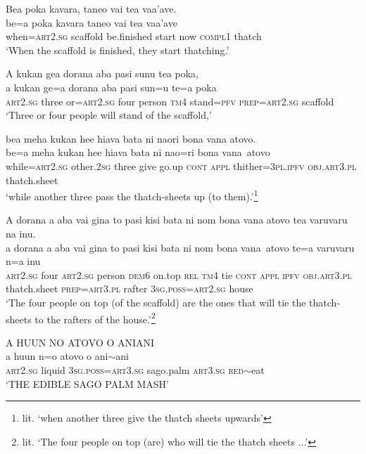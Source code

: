 \ea\label{ex:text2-38}
Bea poka kavara, taneo vai tea vaa'ave.\\
\gll be=a	poka	kavara	taneo	vai	tea	vaa'ave\\
     when=\textsc{art}2.\textsc{sg}	scaffold	be.finished	start	now	\textsc{compl}1	thatch\\
\glt `When the scaffold is finished, they start thatching.'
\z

\ea\label{ex:text2-39}
A kukan gea dorana aba pasi sunu tea poka,\\
\gll a	kukan	ge=a	dorana	aba	pasi	sun=u	te=a	poka\\
     \textsc{art}2.\textsc{sg}	three	or=\textsc{art}2.\textsc{sg}	four	person	\textsc{tm}4	stand=\textsc{pfv}	\textsc{prep}=\textsc{art}2.\textsc{sg}	scaffold\\
\glt `Three or four people will stand of the scaffold,'
\z

\ea\label{ex:text2-40}
bea meha kukan hee hiava bata ni naori bona vana atovo.\\
\gll be=a	meha	kukan	hee	hiava	bata	ni	nao=ri	bona	vana~atovo\\
     while=\textsc{art}2.\textsc{sg}	other.2\textsc{sg}	three	give	go.up	\textsc{cont}	\textsc{appl}	thither=3\textsc{pl}.\textsc{ipfv}	\textsc{obj}.\textsc{art}3.\textsc{pl}	thatch.sheet\\
\glt `while another three pass the thatch-sheets up (to them).'\footnote{lit. `when another three give the thatch sheets upwards'}
\z

\ea\label{ex:text2-41}
A dorana a aba vai gina to pasi kisi bata ni nom bona vana atovo tea varuvaru na inu.\\
\gll a	dorana	a	aba	vai	gina	to	pasi	kisi	bata	ni	nom	bona	vana~atovo	te=a	varuvaru	n=a	inu\\
     \textsc{art}2.\textsc{sg}	four	\textsc{art}2.\textsc{sg}	person	\textsc{dem}6	on.top	\textsc{rel}	\textsc{tm}4	tie	\textsc{cont}	\textsc{appl}	\textsc{ipfv}	\textsc{obj}.\textsc{art}3.\textsc{pl}	thatch.sheet	\textsc{prep}=\textsc{art}3.\textsc{pl}	rafter	3\textsc{sg}.\textsc{poss}=\textsc{art}2.\textsc{sg}	house\\
\glt `The four people on top (of the scaffold) are the ones that will tie the thatch-sheets to the rafters of the house.'\footnote{lit. `The four people on top (are) who will tie the thatch sheets ...'}
\z

\ea\label{ex:text2-42}
A HUUN NO ATOVO O ANIANI\\
\gll a	huun	n=o	atovo	o	ani{$\sim$}ani\\
     \textsc{art}2.\textsc{sg}	liquid	3\textsc{sg}.\textsc{poss}=\textsc{art}3.\textsc{sg}	sago.palm	\textsc{art}3.\textsc{sg}	\textsc{red}{$\sim$}eat\\
\glt `THE EDIBLE SAGO PALM MASH'
\z

